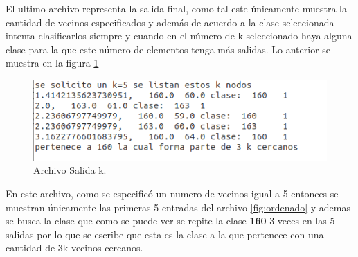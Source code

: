 El ultimo archivo representa la salida final, como tal este únicamente muestra la cantidad de vecinos especificados y además de acuerdo a la clase seleccionada intenta clasificarlos siempre y cuando en el número de k seleccionado haya alguna clase para la que este número de elementos tenga más salidas. Lo anterior se muestra en la figura \ref{fig:salidak} 
\begin{figure}[H]
	\begin{center}
		\hypertarget{fig:salidak}{\hspace{1pt}}
		\includegraphics[width=.7\textwidth]{capitulo4a/images/kcercanos.png}
		\caption{Archivo Salida k.}
		\label{fig:salidak}
	\end{center}
\end{figure}
En este archivo, como se especificó un numero de vecinos igual a 5 entonces se muestran únicamente las primeras 5 entradas del archivo \ref{fig:ordenado} y ademas se busca la clase que como se puede ver se repite la clase \textbf{160} 3 veces en las 5 salidas por lo que se escribe que esta es la clase a la que pertenece con una cantidad de 3k vecinos cercanos.
